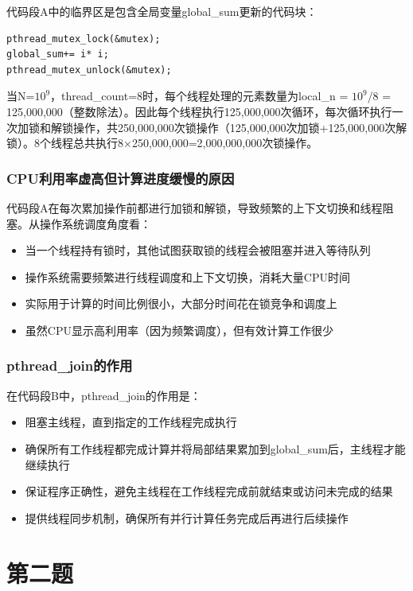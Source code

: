 代码段A中的临界区是包含全局变量global\_sum更新的代码块：
\begin{lstlisting}
pthread_mutex_lock(&mutex); 
global_sum+= i* i;
pthread_mutex_unlock(&mutex);
\end{lstlisting}

当N=$10^9$，thread\_count=8时，每个线程处理的元素数量为local\_n = $10^9$/8 = 125,000,000（整数除法）。因此每个线程执行125,000,000次循环，每次循环执行一次加锁和解锁操作，共250,000,000次锁操作（125,000,000次加锁+125,000,000次解锁）。8个线程总共执行8×250,000,000=2,000,000,000次锁操作。

\subsection{CPU利用率虚高但计算进度缓慢的原因}

代码段A在每次累加操作前都进行加锁和解锁，导致频繁的上下文切换和线程阻塞。从操作系统调度角度看：
\begin{itemize}
    \item 当一个线程持有锁时，其他试图获取锁的线程会被阻塞并进入等待队列
    \item 操作系统需要频繁进行线程调度和上下文切换，消耗大量CPU时间
    \item 实际用于计算的时间比例很小，大部分时间花在锁竞争和调度上
    \item 虽然CPU显示高利用率（因为频繁调度），但有效计算工作很少
\end{itemize}

\subsection{pthread\_join的作用}

在代码段B中，pthread\_join的作用是：
\begin{itemize}
    \item 阻塞主线程，直到指定的工作线程完成执行
    \item 确保所有工作线程都完成计算并将局部结果累加到global\_sum后，主线程才能继续执行
    \item 保证程序正确性，避免主线程在工作线程完成前就结束或访问未完成的结果
    \item 提供线程同步机制，确保所有并行计算任务完成后再进行后续操作
\end{itemize}

\chapter{第二题}

